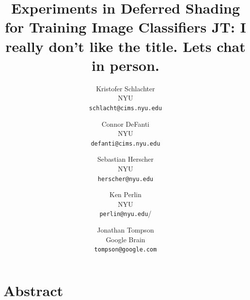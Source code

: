 \documentclass[10pt,twocolumn,letterpaper]{article}
\newcommand{\tompson}[1]{{\color{green} JT: #1}}
\begin{document}
\title{Experiments in Deferred Shading for Training Image Classifiers \tompson{I really don't like the title. Lets chat in person.}}

\author{Kristofer Schlachter\\
NYU\\
{\tt\small schlacht@cims.nyu.edu}
\and
Connor DeFanti\\
NYU\\
{\tt\small defanti@cims.nyu.edu}
\and
Sebastian Herscher\\
NYU\\
{\tt\small herscher@nyu.edu}
\and
Ken Perlin\\
NYU\\
{\tt\small perlin@nyu.edu}/
\and
Jonathan Tompson\\
Google Brain\\
{\tt\small tompson@google.com}
}

\maketitle
\maketitle

\section{Abstract}
\end{document}
